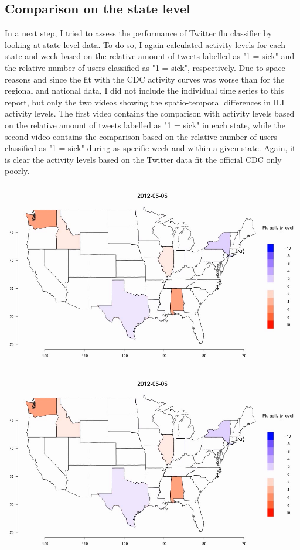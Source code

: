 \documentclass[11pt, a4paper]{article}\usepackage[]{graphicx}\usepackage[]{color}
\begin{document}
\raggedright

\subsection{Comparison on the state level}
In a next step, I tried to assess the performance of Twitter flu classifier by looking at state-level data. To do so, I again calculated activity levels for each state and week based on the relative amount of tweets labelled as "1 = sick" and the relative number of users classified as "1 = sick", respectively. Due to space reasons and since the fit with the CDC activity curves was worse than for the regional and national data, I did not include the individual time series to this report, but only the two videos showing the spatio-temporal differences in ILI activity levels. The first video contains the comparison with activity levels based on the relative amount of tweets labelled as "1 = sick" in each state, while the second video contains the comparison based on the relative number of users classified as "1 = sick" during as specific week and within a given state. Again, it is clear the activity levels based on the Twitter data fit the official CDC only poorly.\newline

\centering \href{run:vids/state_Twitter_cdc_diff_full_rel_sick.avi}{\includegraphics[scale=0.5]{vids/ScreenshotState.png}} 

\bigskip

\centering \href{run:vids/state_Twitter_cdc_diff_full_rel_sick_user.avi}{\includegraphics[scale=0.5]{vids/ScreenshotState.png}} 
\end{document}
